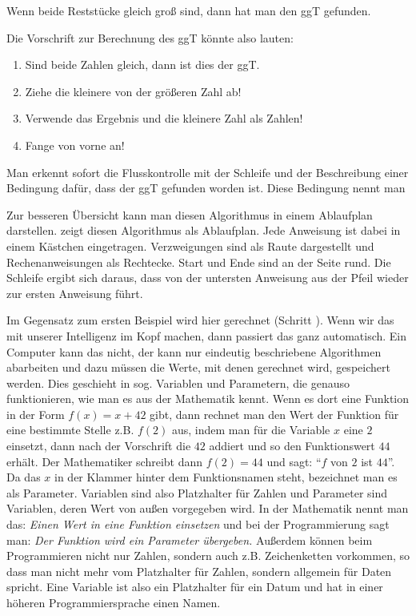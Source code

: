 
Wenn beide Reststücke gleich groß sind, dann hat man den ggT gefunden.
\vfill\null\columnbreak

Die Vorschrift zur Berechnung des ggT könnte also lauten:
\begin{enumerate}
\item Sind beide Zahlen gleich, dann ist dies der ggT.
\item Ziehe die kleinere von der größeren Zahl ab!
\item Verwende das Ergebnis und die kleinere Zahl als Zahlen!
\item Fange von vorne an!
\end{enumerate}

Man erkennt sofort die Flusskontrolle mit der Schleife und der Beschreibung einer Bedingung dafür, dass der ggT gefunden worden ist. 
Diese Bedingung nennt man 

Zur besseren Übersicht kann man diesen Algorithmus in einem Ablaufplan darstellen.  zeigt diesen Algorithmus als Ablaufplan. Jede Anweisung ist dabei in einem Kästchen eingetragen. Verzweigungen sind als Raute dargestellt und Rechenanweisungen als Rechtecke. Start und Ende sind an der Seite rund. Die Schleife ergibt sich daraus, dass von der untersten Anweisung aus der Pfeil wieder zur ersten Anweisung führt.


Im Gegensatz zum ersten Beispiel wird hier gerechnet (Schritt ). Wenn wir das mit unserer Intelligenz im Kopf machen, dann passiert das ganz automatisch. 
Ein Computer kann das nicht, der kann nur eindeutig beschriebene Algorithmen abarbeiten und dazu müssen die Werte, mit denen gerechnet wird, gespeichert werden.
Dies geschieht in sog. Variablen und Parametern, die genauso funktionieren, wie man es aus der Mathematik kennt. 
Wenn es dort eine Funktion in der Form $f(x)=x+42$ gibt, dann rechnet man den Wert der Funktion für eine bestimmte Stelle z.B. $f(2)$ aus, indem man für die
Variable $x$ eine $2$ einsetzt, dann nach der Vorschrift die $42$ addiert und so den Funktionswert $44$ erhält. Der Mathematiker schreibt dann $f(2)=44$ 
und sagt: “$f$ von $2$ ist $44$”. Da das $x$ in der Klammer hinter dem Funktionsnamen steht, bezeichnet man es als Parameter. 
Variablen sind also Platzhalter für Zahlen und Parameter sind Variablen, deren Wert von außen vorgegeben wird. 
In der Mathematik nennt man das: \textit{Einen Wert in eine Funktion einsetzen} und bei der Programmierung sagt man: 
\textit{Der Funktion wird ein Parameter übergeben.}
Außerdem können beim Programmieren nicht nur Zahlen, sondern auch z.B. Zeichenketten vorkommen, so dass man nicht mehr vom Platzhalter für Zahlen, 
sondern allgemein für Daten spricht. Eine Variable ist also ein Platzhalter für ein Datum und hat in einer höheren  Programmiersprache einen Namen.

